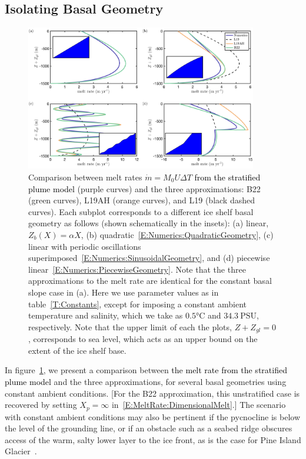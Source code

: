 \documentclass[openacc]{rsproca_new}%
\newcommand{\red}[1]{{\color{red} #1}}
\newcommand{\blue}[1]{{\color{blue} #1}}
\newcommand{\rout}[1]{\red{\st{#1}}}\newcommand{\ab}[1]{\textcolor{Green}{#1}}\newcommand{\about}[1]{\textcolor{Cyan}{\sout{#1}}}
\renewcommand{\rout}[1]{{}} %
\renewcommand{\blue}[1]{{\textcolor{black}{#1}}} %
\renewcommand{\red}[1]{{}} %
\begin{document}
\subsection{Isolating Basal Geometry}\label{S:Numerics:NoPycnocline}
\begin{figure}
\centering
\includegraphics[width = 0.9\textwidth]{./make_plots/plots/figure6.png}
\caption{Comparison between\rout{ numerically obtained} melt rates $\dot{m}= M_0 U \Delta T$ \blue{from the stratified plume model} (purple curves) and the three approximations: B22 (green curves), L19AH (orange curves), and L19 (black dashed curves). Each subplot corresponds to a different ice shelf basal geometry as follows (shown schematically in the insets): (a) linear, $Z_b(X) = \alpha X$, (b) quadratic~\eqref{E:Numerics:QuadraticGeometry}, (c) linear with periodic oscillations superimposed~\eqref{E:Numerics:SinusoidalGeometry}, and (d) piecewise linear~\eqref{E:Numerics:PiecewiseGeometry}. Note that the three approximations to the melt rate are identical for the constant basal slope case in (a).  Here we use parameter values as in table~\ref{T:Constants}, except for imposing a constant ambient temperature and salinity, which we take as $ 0.5\si{\celsius}$ and $34.3~\text{PSU}$, respectively. Note that the upper limit of each the plots, $Z + Z_{gl} = 0$, corresponds to sea level, which acts as an upper bound on the extent of the ice shelf base.}   \label{fig:Numerics:Geometry}
\end{figure}

In figure~\ref{fig:Numerics:Geometry}, we present a comparison between \rout{numerically obtained melt rates}\blue{the melt rate from the stratified plume model} and the three approximations, for several basal geometries using constant ambient conditions. [For the B22 approximation, this unstratified case is recovered by setting $X_p = \infty$ in~\eqref{E:MeltRate:DimensionalMelt}.] The scenario with constant ambient conditions may also be pertinent if the pycnocline is below the level of the grounding line, or if an obstacle such as a seabed ridge obscures access of the warm, salty lower layer to the ice front, as is the case for Pine Island Glacier~\cite{DeRydt2014JGeophysResOceans}. 
\end{document}
